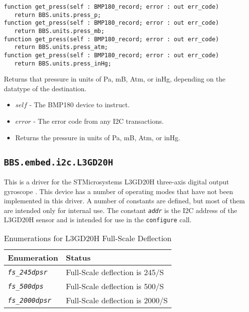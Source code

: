 \documentclass[10pt, openany]{book}
\newcommand{\indextype}[1]{\index[type]{#1}}
\newcommand{\indexfunc}[1]{\index[func]{#1}}
\newcommand{\package}[1]{\texttt{#1}}
\newcommand{\function}[1]{\texttt{#1}}
\newcommand{\constant}[1]{\emph{\texttt{#1}}}
\begin{document}
\begin{lstlisting}
function get_press(self : BMP180_record; error : out err_code)
   return BBS.units.press_p;
function get_press(self : BMP180_record; error : out err_code)
   return BBS.units.press_mb;
function get_press(self : BMP180_record; error : out err_code)
   return BBS.units.press_atm;
function get_press(self : BMP180_record; error : out err_code)
   return BBS.units.press_inHg;
\end{lstlisting}
\indexfunc{get\_press}
Returns that pressure in units of Pa, mB, Atm, or inHg, depending on the datatype of the destination.
\begin{itemize}
  \item $self$ - The BMP180 device to instruct.
  \item $error$ - The error code from any I2C transactions.
  \item Returns the pressure in units of Pa, mB, Atm, or inHg.
\end{itemize}

\subsection{\package{BBS.embed.i2c.L3GD20H}}
This is a driver for the STMicrosystems L3GD20H three-axis digital output gyroscope \cite{L3GD20}.  This device has a number of operating modes that have not been implemented in this driver.  A number of constants are defined, but most of them are intended only for internal use.  The constant \constant{addr} is the I2C address of the L3GD20H sensor and is intended for use in the \function{configure} call.


\begin{table}[!h]
\begin{center}
  \begin{tabular}{l|l}
    Enumeration & Status \\
    \hline
    \constant{fs\_245dpsr} & Full-Scale deflection is  245\degree{}/S\\
    \constant{fs\_500dps} & Full-Scale deflection is  500\degree{}/S \\
    \constant{fs\_2000dpsr} & Full-Scale deflection is  2000\degree{}/S \\
  \end{tabular}
  \caption{Enumerations for L3GD20H Full-Scale Deflection}
  \label{tbl:L3GD20HDef}
  \indextype{fsd}
\end{center}
\end{table}
\end{document}
